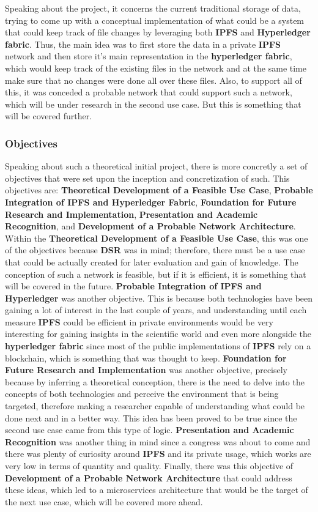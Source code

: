 Speaking about the project, it concerns the current traditional storage of data, trying to come up with a conceptual implementation of what could be a system that could keep track of file changes by leveraging both \textbf{IPFS} and \textbf{Hyperledger fabric}. Thus, the main idea was to first store the data in a private \textbf{IPFS} network and then store it's main representation in the \textbf{hyperledger fabric}, which would keep track of the existing files in the network and at the same time make sure that no changes were done all over these files. Also, to support all of this, it was conceded a probable network that could support such a network, which will be under research in the second use case. But this is something that will be covered further.

\subsubsection{Objectives}
Speaking about such a theoretical initial project, there is more concretly a set of objectives that were set upon the inception and concretization of such. This objectives are: \textbf{Theoretical Development of a Feasible Use Case}, \textbf{Probable Integration of IPFS and Hyperledger Fabric}, \textbf{Foundation for Future Research and Implementation}, \textbf{Presentation and Academic Recognition}, and \textbf{Development of a Probable Network Architecture}. Within the \textbf{Theoretical Development of a Feasible Use Case}, this was one of the objectives because \textbf{DSR} was in mind; therefore, there must be a use case that could be actually created for later evaluation and gain of knowledge. The conception of such a network is feasible, but if it is efficient, it is something that will be covered in the future. \textbf{Probable Integration of IPFS and Hyperledger} was another objective. This is because both technologies have been gaining a lot of interest in the last couple of years, and understanding until each measure \textbf{IPFS} could be efficient in private environments would be very interesting for gaining insights in the scientific world and even more alongside the \textbf{hyperledger fabric} since most of the public implementations of \textbf{IPFS} rely on a blockchain, which is something that was thought to keep. \textbf{Foundation for Future Research and Implementation} was another objective, precisely because by inferring a theoretical conception, there is the need to delve into the concepts of both technologies and perceive the environment that is being targeted, therefore making a researcher capable of understanding what could be done next and in a better way. This idea has been proved to be true since the second use case came from this type of logic. \textbf{Presentation and Academic Recognition} was another thing in mind since a congress was about to come and there was plenty of curiosity around \textbf{IPFS} and its private usage, which works are very low in terms of quantity and quality. Finally, there was this objective of \textbf{Development of a Probable Network Architecture} that could address these ideas, which led to a microservices architecture that would be the target of the next use case, which will be covered more ahead.

